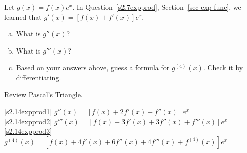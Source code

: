 \begin{question}\label{s2.14expprod}
Let $g(x)=f(x)e^x$.
In Question~\ref{s2.7expprod}, Section~\ref*{sec exp func}, we learned that $g'(x)=[f(x)+f'(x)]e^x$.
\begin{enumerate}[(a)]
\item\label{s2.14expprod1} What is $g''(x)$?
\item\label{s2.14expprod2} What is $g'''(x)$?
\item\label{s2.14expprod3} Based on your answers above, guess a formula for $g^{(4)}(x)$. Check it by differentiating.
\end{enumerate}
\end{question}
\begin{hint}
Review Pascal's Triangle.
\end{hint}
\begin{answer}
\eqref{s2.14expprod1} $g''(x)=[f(x)+2f'(x)+f''(x)]e^x$\\
\eqref{s2.14expprod2}  $g'''(x)=[f(x)+3f'(x)+3f''(x)+f'''(x)]e^x$\\
\eqref{s2.14expprod3} $g^{(4)}(x)=[f(x)+4f'(x)+6f''(x)+4f'''(x)+f^{(4)}(x)]e^x$
\end{answer}

